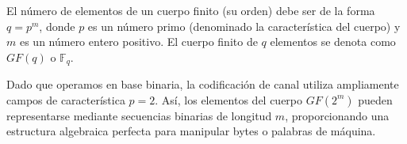 \begin{teorema}
El número de elementos de un cuerpo finito (su orden) debe ser de la forma $q = p^m$, donde $p$ es un número primo (denominado la característica del cuerpo) y $m$ es un número entero positivo. El cuerpo finito de $q$ elementos se denota como $GF(q)$ o $\mathbb{F}_q$.
\end{teorema}

Dado que operamos en base binaria, la codificación de canal utiliza ampliamente campos de característica $p = 2$. Así, los elementos del cuerpo $GF(2^m)$ pueden representarse mediante secuencias binarias de longitud $m$, proporcionando una estructura algebraica perfecta para manipular bytes o palabras de máquina.
